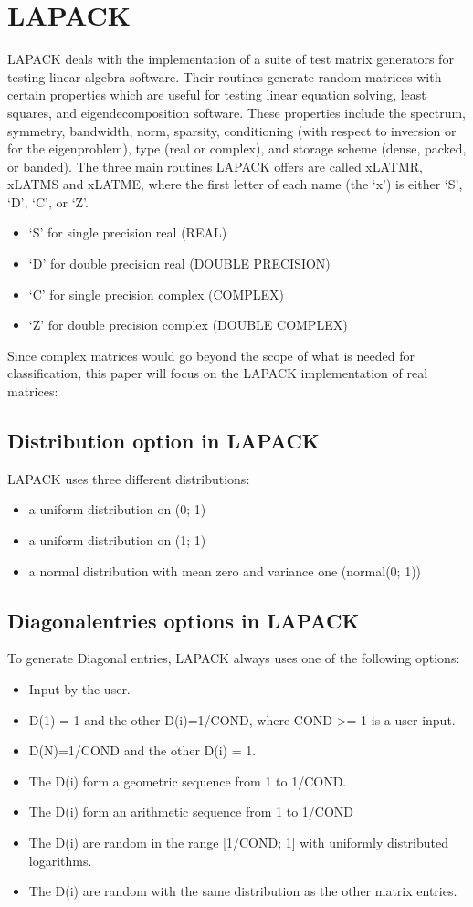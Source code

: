 \documentclass[parskip=full]{scrartcl}
\begin{document}
\section{LAPACK}
LAPACK deals with the implementation of a suite of test matrix generators for testing linear algebra software. Their routines generate random matrices with certain properties which are useful for testing linear equation solving, least squares, and eigendecomposition software. These properties include the spectrum, symmetry, bandwidth, norm, sparsity, conditioning  (with respect to inversion or for the eigenproblem), type (real or complex), and storage scheme (dense, packed, or banded).
The three main routines LAPACK offers are called xLATMR, xLATMS and xLATME, where the first letter of each name (the `x') is either `S', `D', `C', or `Z'. 
\begin{itemize}
\item ‘S’ for single precision real (REAL)
\item ‘D’ for double precision real (DOUBLE PRECISION)
\item ‘C’ for single precision complex (COMPLEX)
\item ‘Z’ for double precision complex (DOUBLE COMPLEX)
\end{itemize}
Since complex matrices would go beyond the scope of what is needed for classification, this paper will focus on the LAPACK implementation of real matrices:

\subsection{Distribution option in LAPACK}
LAPACK uses three different distributions:
\begin{itemize}
\item a uniform distribution on (0; 1)
\item a uniform distribution on (1; 1)
\item a normal distribution with mean zero and variance one (normal(0; 1))
\end{itemize}

\subsection{Diagonalentries options in LAPACK}
To generate Diagonal entries, LAPACK always uses one of the following options:
\begin{itemize}
	\item Input by the user.
	\item D(1) = 1 and the other D(i)=1/COND, where COND >= 1 is a user input.
	\item D(N)=1/COND and the other D(i) = 1. 
	\item The D(i) form a geometric sequence from 1 to 1/COND. 
	\item The D(i) form an arithmetic sequence from 1 to 1/COND
	\item The D(i) are random in the range [1/COND; 1] with uniformly distributed logarithms. 
	\item The D(i) are random with the same distribution as the other matrix entries.
\end{itemize}
\end{document}
